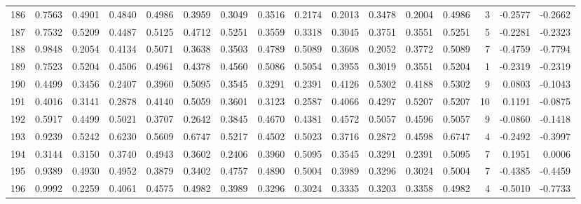 \begin{tabular}{lrrrrrrrrrrrrrrr}
186 &      0.7563 &  0.4901 &  0.4840 &  0.4986 &  0.3959 &  0.3049 &  0.3516 &  0.2174 &  0.2013 &  0.3478 &   0.2004 &     0.4986 &      3 &                   -0.2577 &                    -0.2662 \\
187 &      0.7532 &  0.5209 &  0.4487 &  0.5125 &  0.4712 &  0.5251 &  0.3559 &  0.3318 &  0.3045 &  0.3751 &   0.3551 &     0.5251 &      5 &                   -0.2281 &                    -0.2323 \\
188 &      0.9848 &  0.2054 &  0.4134 &  0.5071 &  0.3638 &  0.3503 &  0.4789 &  0.5089 &  0.3608 &  0.2052 &   0.3772 &     0.5089 &      7 &                   -0.4759 &                    -0.7794 \\
189 &      0.7523 &  0.5204 &  0.4506 &  0.4961 &  0.4378 &  0.4560 &  0.5086 &  0.5054 &  0.3955 &  0.3019 &   0.3551 &     0.5204 &      1 &                   -0.2319 &                    -0.2319 \\
190 &      0.4499 &  0.3456 &  0.2407 &  0.3960 &  0.5095 &  0.3545 &  0.3291 &  0.2391 &  0.4126 &  0.5302 &   0.4188 &     0.5302 &      9 &                    0.0803 &                    -0.1043 \\
191 &      0.4016 &  0.3141 &  0.2878 &  0.4140 &  0.5059 &  0.3601 &  0.3123 &  0.2587 &  0.4066 &  0.4297 &   0.5207 &     0.5207 &     10 &                    0.1191 &                    -0.0875 \\
192 &      0.5917 &  0.4499 &  0.5021 &  0.3707 &  0.2642 &  0.3845 &  0.4670 &  0.4381 &  0.4572 &  0.5057 &   0.4596 &     0.5057 &      9 &                   -0.0860 &                    -0.1418 \\
193 &      0.9239 &  0.5242 &  0.6230 &  0.5609 &  0.6747 &  0.5217 &  0.4502 &  0.5023 &  0.3716 &  0.2872 &   0.4598 &     0.6747 &      4 &                   -0.2492 &                    -0.3997 \\
194 &      0.3144 &  0.3150 &  0.3740 &  0.4943 &  0.3602 &  0.2406 &  0.3960 &  0.5095 &  0.3545 &  0.3291 &   0.2391 &     0.5095 &      7 &                    0.1951 &                     0.0006 \\
195 &      0.9389 &  0.4930 &  0.4952 &  0.3879 &  0.3402 &  0.4757 &  0.4890 &  0.5004 &  0.3989 &  0.3296 &   0.3024 &     0.5004 &      7 &                   -0.4385 &                    -0.4459 \\
196 &      0.9992 &  0.2259 &  0.4061 &  0.4575 &  0.4982 &  0.3989 &  0.3296 &  0.3024 &  0.3335 &  0.3203 &   0.3358 &     0.4982 &      4 &                   -0.5010 &                    -0.7733 \\

\end{tabular}
